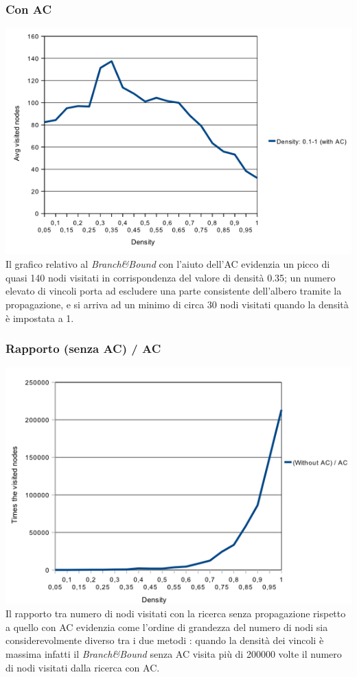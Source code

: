 \documentclass[a4paper,12pt,italian]{article}
\begin{document}
\subsubsection{Con AC}
\includegraphics[scale=0.8]{densAC.png}
\\
Il grafico relativo al \textit{Branch\&Bound} con l'aiuto dell'AC evidenzia un picco di quasi 140 nodi visitati
in corrispondenza del valore di densit\`a 0.35; un numero elevato di vincoli 
porta ad escludere una parte consistente dell'albero tramite la propagazione, e si arriva ad un minimo di circa 
30 nodi visitati quando la densit\`a \`e impostata a 1.


\subsubsection{Rapporto (senza AC) / AC}
\includegraphics[scale=0.8]{densNodesQuotient.png}
\\
Il rapporto tra numero di nodi visitati con la ricerca senza
propagazione rispetto a quello con AC evidenzia
come l'ordine di grandezza del numero di nodi sia considerevolmente
diverso tra i due metodi : quando la densit\`a dei vincoli
\`e massima infatti il \textit{Branch\&Bound} senza AC visita pi\`u di
200000 volte il numero di nodi visitati dalla ricerca con AC.
\end{document}
